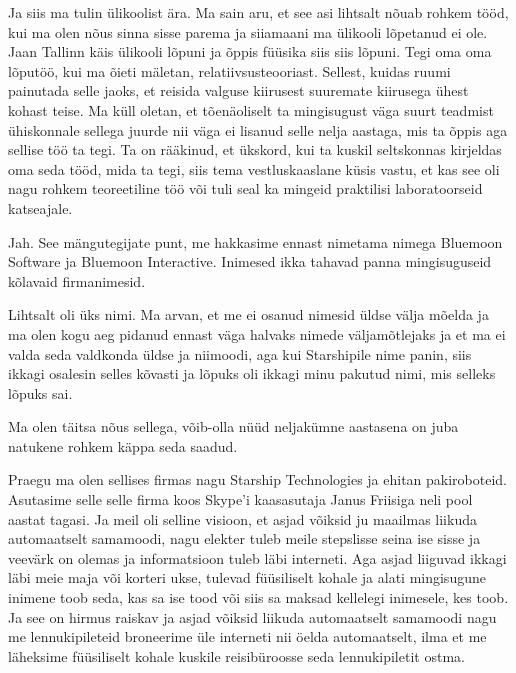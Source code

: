 Ja siis ma tulin ülikoolist ära. Ma sain aru, et see asi lihtsalt nõuab rohkem 
tööd, kui ma olen nõus sinna sisse parema ja siiamaani ma ülikooli lõpetanud ei 
ole. Jaan Tallinn käis ülikooli lõpuni ja õppis 
füüsika siis siis lõpuni. Tegi oma oma lõputöö, kui ma õieti mäletan, 
relatiivsusteooriast. Sellest, kuidas ruumi painutada selle jaoks, et reisida 
valguse kiirusest suuremate kiirusega ühest kohast teise. Ma küll oletan, et 
tõenäoliselt  ta mingisugust väga suurt teadmist ühiskonnale sellega juurde nii 
väga ei lisanud selle nelja aastaga, mis ta õppis aga sellise töö ta tegi. Ta 
on rääkinud, et ükskord, kui ta kuskil seltskonnas kirjeldas oma seda tööd, 
mida ta tegi, siis tema vestluskaaslane küsis  vastu, et kas see oli nagu 
rohkem teoreetiline töö või tuli seal ka mingeid praktilisi laboratoorseid 
katseajale.


Jah. See mängutegijate punt, me hakkasime ennast nimetama nimega Bluemoon 
Software ja Bluemoon Interactive. Inimesed ikka tahavad panna mingisuguseid 
kõlavaid firmanimesid.


Lihtsalt oli üks nimi. Ma arvan, et me ei osanud nimesid üldse välja mõelda ja 
ma olen kogu aeg pidanud ennast väga halvaks nimede väljamõtlejaks ja et ma ei 
valda seda valdkonda üldse ja niimoodi, aga kui Starshipile nime panin, siis ikkagi osalesin selles kõvasti ja  lõpuks oli 
ikkagi minu pakutud nimi, mis selleks lõpuks sai.


Ma olen täitsa nõus sellega, võib-olla nüüd neljakümne aastasena on juba 
natukene rohkem käppa seda saadud. 


Praegu ma olen sellises firmas nagu Starship Technologies ja ehitan 
pakiroboteid. Asutasime selle selle firma koos Skype'i kaasasutaja 
Janus Friisiga  neli pool aastat 
tagasi. Ja meil oli selline 
visioon, et asjad võiksid ju maailmas liikuda automaatselt samamoodi, nagu 
elekter tuleb meile stepslisse seina ise sisse ja veevärk on olemas ja 
informatsioon tuleb läbi interneti. Aga asjad liiguvad ikkagi  läbi meie maja 
või korteri ukse, tulevad füüsiliselt kohale ja alati mingisugune inimene toob 
seda, kas sa ise tood või siis sa maksad kellelegi inimesele, kes toob. Ja see 
on hirmus raiskav ja asjad võiksid liikuda automaatselt samamoodi nagu me 
lennukipileteid broneerime üle interneti nii öelda automaatselt, ilma et me 
läheksime füüsiliselt kohale kuskile reisibüroosse seda lennukipiletit ostma.

